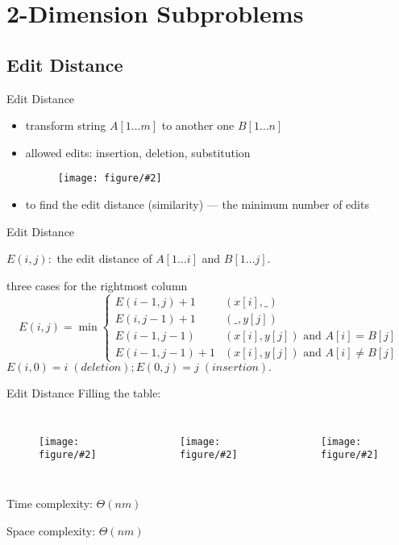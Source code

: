 \documentclass{beamer}
\newcommand{\fig}[2]
{
  \begin{figure}[htp]
	  \centering
	  \texttt{[image: figure/\#2]}
  \end{figure}
}
\begin{document}
\section{2-Dimension Subproblems}

\subsection{Edit Distance}

\begin{frame}{Edit Distance}
  \begin{problem}
    \begin{itemize}
      \item transform string $A[1 \ldots m]$ to another one $B[1 \ldots n]$
      \item allowed edits: insertion, deletion, substitution
        \fig{width = 0.90\textwidth}{editdistanceex}
      \item {} to find the edit distance (similarity) --- the minimum
      number of edits
    \end{itemize}
  \end{problem}
\end{frame}
\begin{frame}{Edit Distance}
  \begin{mdframed}[rightmargin = 1cm]
    $E(i,j):$ the edit distance of $A[1 \ldots i]$ and $B[1 \ldots j]$.
  \end{mdframed}
  
  \vspace{0.50cm}
  \begin{theorem}[Recurrence]
     three cases for the rightmost column
    \begin{displaymath}
      E(i,j) = \min \left\{
        \begin{array}{ll}
          E(i-1,j) + 1 & (x[i], \_) \\
          E(i, j-1) + 1 & (\_, y[j]) \\
          E(i-1, j-1) & (x[i], y[j]) \textrm{ and $A[i] = B[j]$}  \\
          E(i-1, j-1) + 1 & (x[i], y[j]) \textrm{ and $A[i] \neq B[j]$}  
        \end{array}
      \right.
    \end{displaymath}
    $E(i,0) = i \; (deletion); E(0,j) = j \; (insertion).$ 
  \end{theorem}
\end{frame}
\begin{frame}{Edit Distance}
  Filling the table:
  \begin{columns}
      \fig{width = 0.80\textwidth}{EDorder}
      \fig{width = 0.80\textwidth}{row-major}
      \fig{width = 0.80\textwidth}{col-major}
  \end{columns}
  
  \vspace{0.80cm}
  Time complexity: $\Theta(nm)$
  
  Space complexity: $\Theta(nm)$
\end{frame}
\end{document}
